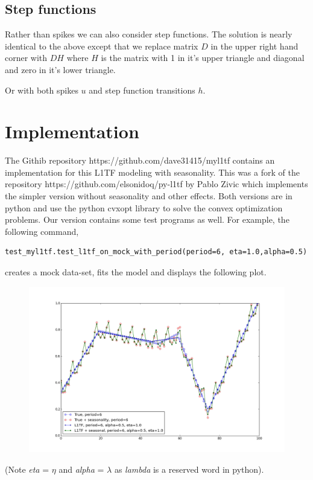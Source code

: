 \documentclass{article}
\begin{document}
\subsection{Step functions}

Rather than spikes we can also consider step functions. The solution is nearly identical to the
above except that we replace matrix $D$ in the upper right hand corner with $D H$ where
$H$ is the matrix with 1 in it's upper triangle and diagonal and zero in it's lower triangle.

Or with both spikes $u$ and step function transitions $h$. 


\section{Implementation}
The Githib repository https://github.com/dave31415/myl1tf contains an implementation for this
L1TF modeling with seasonality. This was a fork of the repository
https://github.com/elsonidoq/py-l1tf by Pablo Zivic which implements the
simpler version without seasonality and other effects. Both versions are in python and
use the python cvxopt library to solve the convex optimization problems. Our
version contains some test programs as well. For example, the following command,
\begin{verbatim}
test_myl1tf.test_l1tf_on_mock_with_period(period=6, eta=1.0,alpha=0.5)
\end{verbatim}
creates a mock data-set, fits the model and displays the following plot.
\begin{figure}
\centering
\includegraphics[width=500pt]{example.png}
\end{figure}
(Note \emph{eta} = $\eta$ and \emph{alpha} = $\lambda$ as \emph{lambda} is a reserved word in python).
\end{document}

